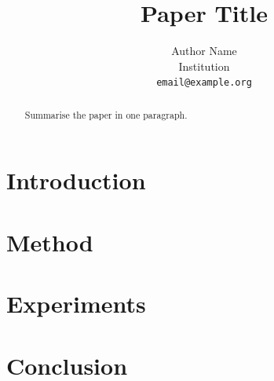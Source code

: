 \documentclass[11pt]{article}
\title{Paper Title}
\author{Author Name \\ Institution \\ \texttt{email@example.org}}
\begin{document}
\maketitle

\begin{abstract}
Summarise the paper in one paragraph.
\end{abstract}

\section{Introduction}

\section{Method}

\section{Experiments}

\section{Conclusion}
\end{document}
